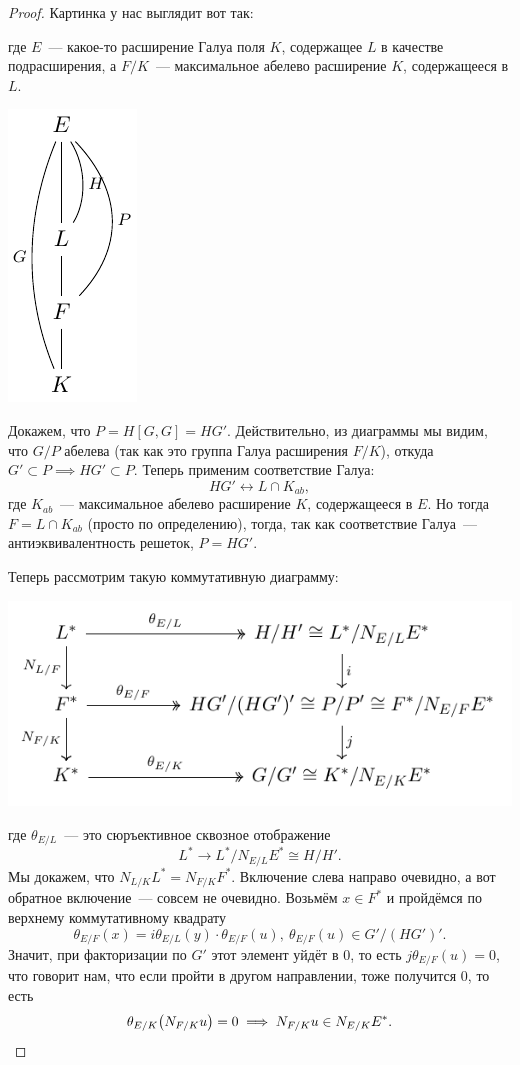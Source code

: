 	\begin{proof}
		Картинка у нас выглядит вот так: 

		где $E$~--- какое-то расширение Галуа поля $K$, содержащее $L$ в качестве подрасширения, а $F/K$~--- максимальное абелево расширение $K$, содержащееся в $L$.

		\begin{center}
				\includegraphics{lectures/6/pictures/cd_41.pdf}
	\end{center}

	Докажем, что $P = H [G, G] = H G'$. Действительно, из диаграммы мы видим, что $G/P$ абелева (так как это группа Галуа расширения $F/K$), откуда $G' \subset P \implies H G' \subset P$. Теперь применим соответствие Галуа: 
	\[
		H G' \leftrightarrow L \cap K_{ab},
	\]
	где $K_{ab}$~--- максимальное абелево расширение $K$, содержащееся в $E$. Но тогда $F = L \cap K_{ab}$ (просто по определению), тогда, так как соответствие Галуа~--- антиэквивалентность решеток, $P = H G'$. 

	Теперь рассмотрим такую коммутативную диаграмму: 
	\begin{center}
				\includegraphics{lectures/6/pictures/cd_42.pdf}
	\end{center}

	где $\theta_{E/L}$~--- это сюръективное сквозное отображение 
	\[
		L^* \to L^*/N_{E/L}E^* \cong H/H'.
	\]
	Мы докажем, что $N_{L/K}L^* = N_{F/K}F^*$. Включение слева направо очевидно, а вот обратное включение~--- совсем не очевидно. Возьмём $x \in F^*$ и пройдёмся по верхнему коммутативному квадрату 
	\[
		\theta_{E/F}(x) = i \theta_{E/L}(y) \cdot \theta_{E/F}(u), \ \theta_{E/F}(u) \in G' / (HG')'.
	\]
	Значит, при факторизации по $G'$ этот элемент уйдёт в 0, то есть $j\theta_{E/F}(u) = 0$, что говорит нам, что если пройти в другом направлении, тоже получится 0, то есть
	\[
		\theta_{E/K}\lr*{N_{F/K}{u}} = 0 \implies N_{F/K}{u} \in N_{E/K}E^*.
	\]


\end{proof}
